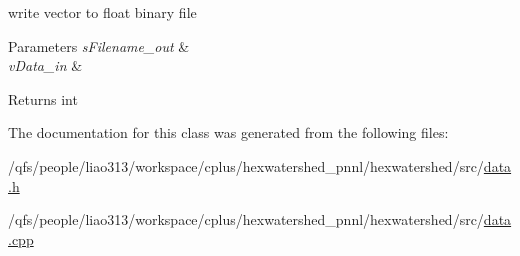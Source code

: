 write vector to float binary file 


\begin{DoxyParams}{Parameters}
{\em s\-Filename\-\_\-out} & \\
\hline
{\em v\-Data\-\_\-in} & \\
\hline
\end{DoxyParams}
\begin{DoxyReturn}{Returns}
int 
\end{DoxyReturn}


The documentation for this class was generated from the following files\-:\begin{DoxyCompactItemize}
\item 
/qfs/people/liao313/workspace/cplus/hexwatershed\-\_\-pnnl/hexwatershed/src/\hyperlink{data_8h}{data.\-h}\item 
/qfs/people/liao313/workspace/cplus/hexwatershed\-\_\-pnnl/hexwatershed/src/\hyperlink{data_8cpp}{data.\-cpp}\end{DoxyCompactItemize}
